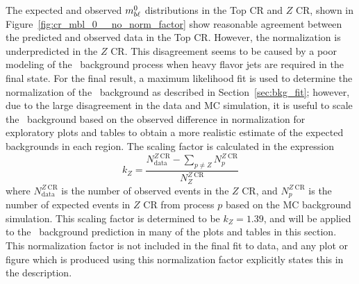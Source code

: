 The expected and observed $m_{b\ell}^{0}$ distributions in the Top CR and $Z$ CR,
shown in Figure~\ref{fig:cr_mbl_0__no_norm_factor} show reasonable agreement
between the predicted and observed data in the Top CR.
However, the normalization is underpredicted in the $Z$ CR.
This disagreement seems to be caused by a poor modeling of the
\ZGAMMAJETS\ background process when heavy flavor jets are required in the
final state.
For the final result, a maximum likelihood fit is used to determine the
normalization of the \ZGAMMAJETS\ background as described in
Section~\ref{sec:bkg_fit}; however, due to the large disagreement in the
data and MC simulation, it is useful to scale the \ZGAMMAJETS\ background based
on the observed difference in normalization for exploratory plots and tables to
obtain a more realistic estimate of the expected backgrounds in each region.
The scaling factor is calculated in the expression
\begin{equation}
  k_Z = \frac{N_\mathrm{data}^{Z~\mathrm{CR}} -
                \sum_{p \neq Z}N_{p}^{Z~\mathrm{CR}} }
             {N_{Z}^{Z~\mathrm{CR}}}
\end{equation}
where $N_\mathrm{data}^{Z~\mathrm{CR}}$ is the number of observed events in
the $Z$ CR, and $N_{p}^{Z~\mathrm{CR}}$ is the number of expected events in
$Z$ CR from process $p$ based on the MC background simulation.
This scaling factor is determined to be $k_Z = 1.39$, and will be applied to
the \ZGAMMAJETS\ background prediction in many of the plots and tables in this
section.
This normalization factor is not included in the final fit to data, and any plot
or figure which is produced using this normalization factor explicitly
states this in the description.

